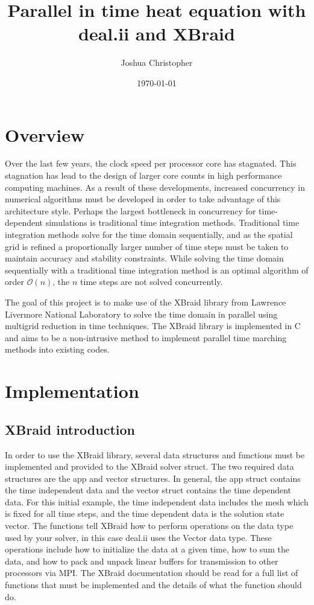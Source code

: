 \documentclass{article}
\title{Parallel in time heat equation with deal.ii and XBraid}
\date{\today}
\author{Joshua Christopher}
\begin{document}
\maketitle

\section{Overview}\label{overview}

Over the last few years, the clock speed per processor core has stagnated\cite{friedhoff2013}\cite{falgout2014}.
This stagnation has lead to the design of larger core counts in high performance computing machines.
As a result of these developments, increased concurrency in numerical algorithms must be developed in order to take advantage of this architecture style.
Perhaps the largest bottleneck in concurrency for time-dependent simulations is traditional time integration methods.
Traditional time integration methods solve for the time domain sequentially, and as the spatial grid is refined a proportionally larger number of time steps must be taken to maintain accuracy and stability constraints.
While solving the time domain sequentially with a traditional time integration method is an optimal algorithm of order \(\mathcal{O}(n)\), the \(n\) time steps are not solved concurrently.

The goal of this project is to make use of the XBraid library from Lawrence Livermore National Laboratory\cite{xbraid-package} to solve the time domain in parallel using multigrid reduction in time techniques.
The XBraid library is implemented in C and aims to be a non-intrusive method to implement parallel time marching methods into existing codes.

\section{Implementation}\label{implementation}

\subsection{XBraid introduction}\label{xbraid-introduction}

In order to use the XBraid library, several data structures and functions must be implemented and provided to the XBraid solver struct\cite{schroder2017}.
The two required data structures are the app and vector structures.
In general, the app struct contains the time independent data and the vector struct contains the time dependent data.
For this initial example, the time independent data includes the mesh which is fixed for all time steps, and the time dependent data is the solution state vector.
The functions tell XBraid how to perform operations on the data type used by your solver, in this case deal.ii uses the Vector data type.
These operations include how to initialize the data at a given time, how to sum the data, and how to pack and unpack linear buffers for transmission to other processors via MPI.
The XBraid documentation should be read for a full list of functions that must be implemented and the details of what the function should do.
\end{document}
